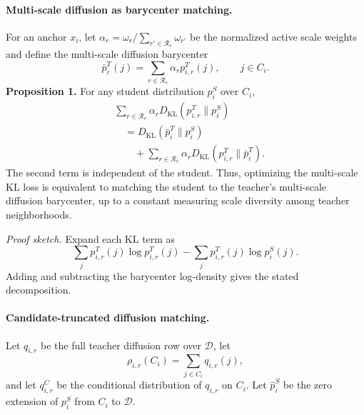 \paragraph{Multi-scale diffusion as barycenter matching.}
For an anchor $x_i$, let $\alpha_r=\omega_r/\sum_{r'\in\mathcal{R}_e}\omega_{r'}$ be the normalized active scale weights and define the multi-scale diffusion barycenter
\begin{equation}
    \bar p_i^T(j)=
    \sum_{r\in\mathcal{R}_e}\alpha_r p_{i,r}^T(j),
    \qquad j\in C_i.
\end{equation}
\noindent\textbf{Proposition 1.}
For any student distribution $p_i^S$ over $C_i$,
\begin{equation}
\begin{aligned}
&\sum_{r\in\mathcal{R}_e}\alpha_r
D_{\mathrm{KL}}(p_{i,r}^T\|p_i^S)\\
&\quad=
D_{\mathrm{KL}}(\bar p_i^T\|p_i^S)
\\
&\qquad+
\sum_{r\in\mathcal{R}_e}\alpha_r
D_{\mathrm{KL}}(p_{i,r}^T\|\bar p_i^T).
\end{aligned}
\end{equation}
The second term is independent of the student. Thus, optimizing the multi-scale KL loss is equivalent to matching the student to the teacher's multi-scale diffusion barycenter, up to a constant measuring scale diversity among teacher neighborhoods.

\emph{Proof sketch.}
Expand each KL term as
\begin{equation}
    \sum_j p_{i,r}^T(j)\log p_{i,r}^T(j)
    -
    \sum_j p_{i,r}^T(j)\log p_i^S(j).
\end{equation}
Adding and subtracting the barycenter log-density gives the stated decomposition.

\paragraph{Candidate-truncated diffusion matching.}
Let $q_{i,r}$ be the full teacher diffusion row over $\mathcal{D}$, let
\begin{equation}
    \rho_{i,r}(C_i)=\sum_{j\in C_i}q_{i,r}(j),
\end{equation}
and let $q_{i,r}^{C}$ be the conditional distribution of $q_{i,r}$ on $C_i$. Let $\widehat p_i^S$ be the zero extension of $p_i^S$ from $C_i$ to $\mathcal{D}$.

